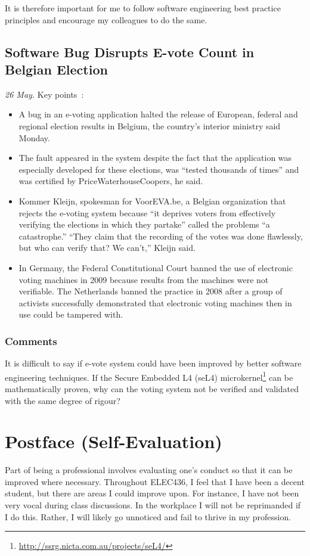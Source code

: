 \documentclass[11pt,a4paper]{report}
\begin{document}
	It is therefore important for me to follow software engineering best practice principles and encourage my colleagues to do the same.
	
	\section{Software Bug Disrupts E-vote Count in Belgian Election}
	\textit{26 May.} Key points~\cite{news11}:
	\begin{itemize}
		\item A bug in an e-voting application halted the release of European, federal and regional election results in Belgium, the country's interior ministry said Monday.
		\item The fault appeared in the system despite the fact that the application was especially developed for these elections, was ``tested thousands of times'' and was certified by PriceWaterhouseCoopers, he said.
		\item Kommer Kleijn, spokesman for VoorEVA.be, a Belgian organization that rejects the e-voting system because ``it deprives voters from effectively verifying the elections in which they partake'' called the problems ``a catastrophe.'' ``They claim that the recording of the votes was done flawlessly, but who can verify that? We can't,'' Kleijn said.
		\item In Germany, the Federal Constitutional Court banned the use of electronic voting machines in 2009 because results from the machines were not verifiable. The Netherlands banned the practice in 2008 after a group of activists successfully demonstrated that  electronic voting machines then in use could be tampered with.
	\end{itemize}
	\subsection{Comments}
	It is difficult to say if e-vote system could have been improved by better software engineering techniques. If the Secure Embedded L4 (seL4) microkernel\footnote{\url{http://ssrg.nicta.com.au/projects/seL4/}} can be mathematically proven, why can the voting system not be verified and validated with the same degree of rigour?
	
	\chapter*{Postface (Self-Evaluation)}
	Part of being a professional involves evaluating one's conduct so that it can be improved where necessary. Throughout ELEC436, I feel that I have been a decent student, but there are areas I could improve upon. For instance, I have not been very vocal during class discussions. In the workplace I will not be reprimanded if I do this. Rather, I will likely go unnoticed and fail to thrive in my profession.
	
\end{document}

